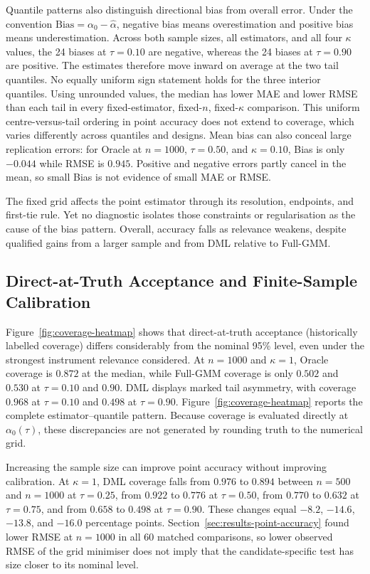 Quantile patterns also distinguish directional bias from overall error. Under the convention $\mathrm{Bias}=\alpha_0-\widehat\alpha$, negative bias means overestimation and positive bias means underestimation. Across both sample sizes, all estimators, and all four $\kappa$ values, the 24 biases at $\tau=0.10$ are negative, whereas the 24 biases at $\tau=0.90$ are positive. The estimates therefore move inward on average at the two tail quantiles. No equally uniform sign statement holds for the three interior quantiles. Using unrounded values, the median has lower MAE and lower RMSE than each tail in every fixed-estimator, fixed-$n$, fixed-$\kappa$ comparison. This uniform centre-versus-tail ordering in point accuracy does not extend to coverage, which varies differently across quantiles and designs. Mean bias can also conceal large replication errors: for Oracle at $n=1000$, $\tau=0.50$, and $\kappa=0.10$, Bias is only $-0.044$ while RMSE is $0.945$. Positive and negative errors partly cancel in the mean, so small Bias is not evidence of small MAE or RMSE.

The fixed grid affects the point estimator through its resolution, endpoints, and first-tie rule. Yet no diagnostic isolates those constraints or regularisation as the cause of the bias pattern. Overall, accuracy falls as relevance weakens, despite qualified gains from a larger sample and from DML relative to Full-GMM.

\subsection{Direct-at-Truth Acceptance and Finite-Sample Calibration}
\label{sec:results-coverage}

Figure~\ref{fig:coverage-heatmap} shows that direct-at-truth acceptance (historically labelled coverage) differs considerably from the nominal 95\% level, even under the strongest instrument relevance considered. At $n=1000$ and $\kappa=1$, Oracle coverage is $0.872$ at the median, while Full-GMM coverage is only $0.502$ and $0.530$ at $\tau=0.10$ and $0.90$. DML displays marked tail asymmetry, with coverage $0.968$ at $\tau=0.10$ and $0.498$ at $\tau=0.90$. Figure~\ref{fig:coverage-heatmap} reports the complete estimator--quantile pattern. Because coverage is evaluated directly at $\alpha_0(\tau)$, these discrepancies are not generated by rounding truth to the numerical grid.



Increasing the sample size can improve point accuracy without improving calibration. At $\kappa=1$, DML coverage falls from $0.976$ to $0.894$ between $n=500$ and $n=1000$ at $\tau=0.25$, from $0.922$ to $0.776$ at $\tau=0.50$, from $0.770$ to $0.632$ at $\tau=0.75$, and from $0.658$ to $0.498$ at $\tau=0.90$. These changes equal $-8.2$, $-14.6$, $-13.8$, and $-16.0$ percentage points. Section~\ref{sec:results-point-accuracy} found lower RMSE at $n=1000$ in all 60 matched comparisons, so lower observed RMSE of the grid minimiser does not imply that the candidate-specific test has size closer to its nominal level.

